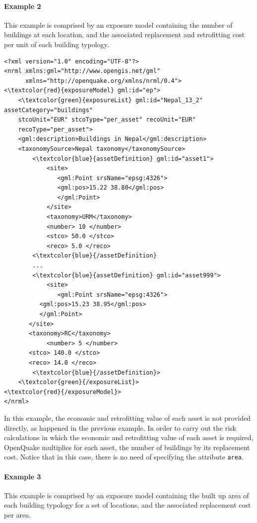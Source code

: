 \paragraph{Example 2}
This example is comprised by an exposure model containing the number of buildings at each location, and the associated replacement and retrofitting cost per unit of each building typology.

\begin{Verbatim}[frame=single, commandchars=\\\{\}, samepage=false]
<?xml version="1.0" encoding="UTF-8"?>
<nrml xmlns:gml="http://www.opengis.net/gml"
      xmlns="http://openquake.org/xmlns/nrml/0.4">
<\textcolor{red}{exposureModel} gml:id="ep">
    <\textcolor{green}{exposureList} gml:id="Nepal_13_2" assetCategory="buildings" 
    stcoUnit="EUR" stcoType="per_asset" recoUnit="EUR" 
    recoType="per_asset">
    <gml:description>Buildings in Nepal</gml:description>
    <taxonomySource>Nepal taxonomy</taxonomySource>
        <\textcolor{blue}{assetDefinition} gml:id="asset1">
            <site>
               <gml:Point srsName="epsg:4326">
               <gml:pos>15.22 38.80</gml:pos>
               </gml:Point>
            </site>
            <taxonomy>URM</taxonomy>
            <number> 10 </number>
            <stco> 50.0 </stco>
            <reco> 5.0 </reco>
        <\textcolor{blue}{/assetDefinition} 
        ...
        <\textcolor{blue}{assetDefinition} gml:id="asset999">
            <site>
               <gml:Point srsName="epsg:4326">
	      <gml:pos>15.23 38.95</gml:pos>
	      </gml:Point>
	   </site>
	   <taxonomy>RC</taxonomy>
            <number> 5 </number>
	   <stco> 140.0 </stco>
	   <reco> 14.0 </reco>
        <\textcolor{blue}{/assetDefinition}> 
    <\textcolor{green}{/exposureList}>
<\textcolor{red}{/exposureModel}>
</nrml>
\end{Verbatim}

In this example, the economic and retrofitting value of each asset is not provided directly, as happened in the previous example. In order to carry out the risk calculations in which the economic and retrofitting value of each asset is required, OpenQuake multiplies for each asset, the number of buildings by its replacement cost. Notice that in this case, there is no need of specifying the attribute \Verb+area+. 

\paragraph{Example 3}
This example is comprised by an exposure model containing the built up area of each building typology for a set of locations, and the associated replacement cost per area.

